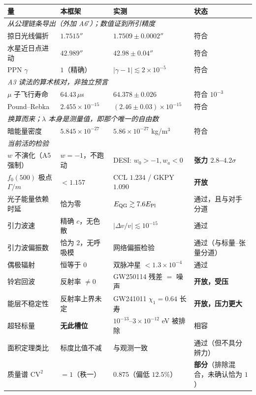 \documentclass[11pt,a4paper]{article}
\theoremstyle{sudef}
\begin{document}
\begin{center}
\small
\begin{tabular}{llll}
\toprule
量 & 本框架 & 实测 & 状态 \\
\midrule
\multicolumn{4}{l}{\emph{从公理链条导出（外加 A6$'$）；数值证到所引精度}}\\
掠日光线偏折 & $1.7515''$ & $1.7509\pm0.0002''$ & 符合 \\
水星近日点进动 & $42.989''$ & $42.98\pm0.04''$ & 符合 \\
PPN $\gamma$ & $1$（精确） & $|\gamma-1|\lesssim2\times10^{-5}$ & 符合 \\
\midrule
\multicolumn{4}{l}{\emph{A3 读法的算术核对，非独立预言}}\\
$\mu$ 子飞行寿命 & $64.43\,\mu$s & $64.378\pm0.026$ & 符合 $10^{-3}$ \\
Pound--Rebka & $2.455\times10^{-15}$ & $(2.46\pm0.03)\times10^{-15}$ & 符合 \\
\midrule
\multicolumn{4}{l}{\emph{换算而来；$\lambda$ 本身是测量值，即那个唯一的自由数}}\\
暗能量密度 & $5.845\times10^{-27}$ & $5.86\times10^{-27}$ kg/m$^3$ & 符合 \\
\midrule
\multicolumn{4}{l}{\emph{当前活的检验}}\\
$w$ 不演化（A5 强制） & $w=-1$，不跑动 & DESI: $w_0>-1,w_a<0$ & \textbf{张力 $2.8$--$4.2\sigma$} \\
$f_0(500)$ 极点 $\Gamma/m$ & $<1.157$ & CCL $1.234$ / GKPY $1.090$ & \textbf{开放} \\
光子能量依赖时延 & 恰为零 & $E_{\rm QG}\gtrsim7.6E_{\rm Pl}$ & 通过，且与对手分道 \\
引力波速 & 精确 $c$，无色散 & $|\Delta v/v|\lesssim10^{-15}$ & 通过 \\
引力波偏振数 & 恰为 $2$，无呼吸模 & 网络偏振检验 & 通过（与标量--张量分道）\\
偶极辐射 & 恒等于 $0$ & 双脉冲星 $<1.3{\times}10^{-4}$ & 通过 \\
铃宕回波 & 反射率 $\neq0$ & GW250114 残差 $=$ 噪声 & \textbf{开放，受压} \\
能层不稳定性 & 反射率上界未定 & GW241011 $\chi_1=0.64$ 长寿 & \textbf{开放，压力更大} \\
超轻标量 & \textbf{无此槽位} & $10^{-13}$--$3{\times}10^{-12}$ eV 被排除 & 相容 \\
面积定理类比 & 标度比值不减 & 与观测一致 & 通过（但不具分辨力）\\
质量谱 $\mathrm{CV}^2$ & $=1$（秩一） & $0.875$（偏低 $12.5\%$） & \textbf{部分}（排除混合，未确认恰为 $1$）\\

\end{tabular}
\end{center}
\end{document}
